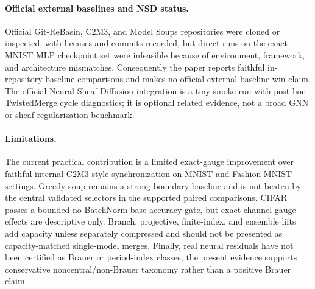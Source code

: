 \paragraph{Official external baselines and NSD status.}
Official Git-ReBasin, C2M3, and Model Soups repositories were cloned or inspected, with licenses and commits recorded, but direct runs on the exact MNIST MLP checkpoint set were infeasible because of environment, framework, and architecture mismatches. Consequently the paper reports faithful in-repository baseline comparisons and makes no official-external-baseline win claim. The official Neural Sheaf Diffusion integration is a tiny smoke run with post-hoc TwistedMerge cycle diagnostics; it is optional related evidence, not a broad GNN or sheaf-regularization benchmark.

\paragraph{Limitations.}
The current practical contribution is a limited exact-gauge improvement over faithful internal C2M3-style synchronization on MNIST and Fashion-MNIST settings. Greedy soup remains a strong boundary baseline and is not beaten by the central validated selectors in the supported paired comparisons. CIFAR passes a bounded no-BatchNorm base-accuracy gate, but exact channel-gauge effects are descriptive only. Branch, projective, finite-index, and ensemble lifts add capacity unless separately compressed and should not be presented as capacity-matched single-model merges. Finally, real neural residuals have not been certified as Brauer or period-index classes; the present evidence supports conservative noncentral/non-Brauer taxonomy rather than a positive Brauer claim.
